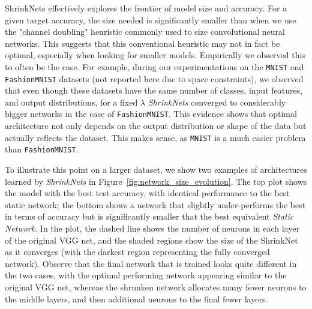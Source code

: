 ShrinkNets effectively explores the frontier of model size and accuracy. For a
given target accuracy, the size needed is significantly smaller than when we use the
"channel doubling" heuristic commonly used to size convolutional neural networks.
This suggests that this conventional heuristic may not in fact be optimal,
especially when looking for smaller models.  Empirically we observed this to
often be the case.  For example, during our experimentations on the
\texttt{MNIST} \cite{Lecun1998} and \texttt{FashionMNIST} \cite{Xiao2017}
datasets (not reported here due to space constraints), we observed that even
though these datasets have the same number of classes, input features, and
output distributions, for a fixed $\lambda$ \textit{ShrinkNets} converged to
considerably bigger networks in the case of \texttt{FashionMNIST}. This evidence
shows that optimal architecture not only depends on the output distribution or
shape of the data but actually reflects the dataset.  This makes sense, as
\texttt{MNIST} is a much easier problem than \texttt{FashionMNIST}.

To illustrate this point on a larger dataset, we show two examples of
architectures learned by \textit{ShrinkNets} in
Figure~\ref{fig:network_size_evolution}.  The top plot shows the model with the
best test accuracy, with identical performance to the best static
network; the bottom shows a network that slightly under-performs the best in
terms of accuracy but is significantly smaller that the best equivalent
\textit{Static Network}.  In the plot, the dashed line
shows the number of neurons in each layer of the original VGG net, and the
shaded regions show the size of the ShrinkNet as it converges (with the darkest
region representing the fully converged network).  Observe that the final
network that is trained looks quite different in the two cases, with the optimal
performing network appearing similar to the original VGG net, whereas the
shrunken network allocates many fewer neurons to the middle layers, and then
additional neurons to the final fewer layers.


